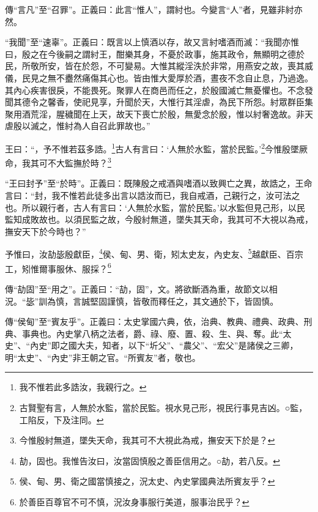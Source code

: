 {\noindent\zhuan{}\fzbyks 傳“言凡”至“召罪”。正義曰：此言“惟人”，謂紂也。今變言“人”者，見雖非紂亦然。 \par}

{\noindent\shu{}\fzkt “我聞”至“速辜”。正義曰：既言以上慎酒以存，故又言紂嗜酒而滅：“我聞亦惟曰，殷之在今後嗣之謂紂王，酣樂其身，不憂於政事，施其政令，無顯明之德於民，所敬所安，皆在於怨，不可變易。大惟其縱淫泆於非常，用燕安之故，喪其威儀，民見之無不衋然痛傷其心也。皆由惟大愛厚於酒，晝夜不念自止息，乃過逸。其內心疾害很戾，不能畏死。聚罪人在商邑而任之，於殷國滅亡無憂懼也。不念發聞其德令之馨香，使祀見享，升聞於天，大惟行其淫虐，為民下所怨。紂眾群臣集聚用酒荒淫，腥穢聞在上天，故天下喪亡於殷，無愛念於殷，惟以紂奢逸故。非天虐殷以滅之，惟紂為人自召此罪故也。” \par}

王曰：“，予不惟若茲多誥。\footnote{我不惟若此多誥汝，我親行之。}古人有言曰：‘人無於水監，當於民監。’\footnote{古賢聖有言，人無於水監，當於民監。視水見己形，視民行事見吉凶。○監，工陷反，下及注同。}今惟殷墜厥命，我其可不大監撫於時？\footnote{今惟殷紂無道，墜失天命，我其可不大視此為戒，撫安天下於是？}

{\noindent\shu{}\fzkt “王曰封予”至“於時”。正義曰：既陳殷之戒酒與嗜酒以致興亡之異，故誥之，王命言曰：“封，我不惟若此徒多出言以誥汝而已，我自戒酒，己親行之，汝可法之也。所以親行者，古人有言曰：‘人無於水監，當於民監。’以水監但見己形，以民監知成敗故也。以須民監之故，今殷紂無道，墜失其天命，我其可不大視以為戒，撫安天下於今時也？” \par}

予惟曰，汝劼毖殷獻臣，\footnote{劼，固也。我惟告汝曰，汝當固慎殷之善臣信用之。○劼，若八反。}侯、甸、男、衛，矧太史友，內史友、\footnote{侯、甸、男、衛之國當慎接之，況太史、內史掌國典法所賓友乎？}越獻臣、百宗工，矧惟爾事服休、服採？\footnote{於善臣百尊官不可不慎，況汝身事服行美道，服事治民乎？}



{\noindent\zhuan{}\fzbyks 傳“劼固”至“用之”。正義曰：“劼，固”，文。將欲斷酒為重，故節文以相況。“毖”訓為慎，言誠堅固謹慎，皆敬而釋任之，其文通於下，皆固慎。 \par}

{\noindent\zhuan{}\fzbyks 傳“侯甸”至“賓友乎”。正義曰：太史掌國六典，依，治典、教典、禮典、政典、刑典、事典也。內史掌八柄之法者，爵、祿、廢、置、殺、生、與、奪。此“太史”、“內史”即之國大夫，知者，以下“圻父”、“農父”、“宏父”是諸侯之三卿，明“太史”、“內史”非王朝之官。“所賓友”者，敬也。 \par}

